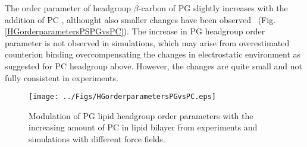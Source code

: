 \documentclass[aps,prl,superscriptaddress,twocolumn]{revtex4}
\begin{document}
The order parameter of headgroup $\beta$-carbon of PG slightly increases with the addition
of PC \cite{macdonald87}, althought also smaller changes have been observed~\cite{borle85}
(Fig. \ref{HGorderparametersPSPGvsPC}).
The increase in PG headgroup order parameter is not observed in simulations, which
may arise from overestimated counterion binding overcompensating the changes in
electrostatic environment as suggested for PC headgroup above. However, the changes
are quite small and not fully consistent in experiments.
\begin{figure}[]
  \centering
  \texttt{[image: ../Figs/HGorderparametersPGvsPC.eps]}
  \caption{\label{HGorderparametersPGvsPC}
    Modulation of PG lipid headgroup order parameters with the increasing amount of PC in lipid bilayer
    from experiments \cite{borle85,macdonald87} and simulations with different force fields.
  }
\end{figure}

\clearpage
\end{document}
